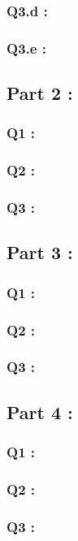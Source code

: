 \documentclass[fleqn]{article}
\begin{document}
\subsubsection*{Q3.d :}



\subsubsection*{Q3.e :}


\newpage

\subsection*{Part 2 :}

\subsubsection*{Q1 :}


\subsubsection*{Q2 :}


\subsubsection*{Q3 :}


\subsection*{Part 3 :}

\subsubsection*{Q1 :}


\subsubsection*{Q2 :}


\subsubsection*{Q3 :}


\newpage
\subsection*{Part 4 :}

\subsubsection*{Q1 :}


\subsubsection*{Q2 :}


\subsubsection*{Q3 :}

\end{document}

